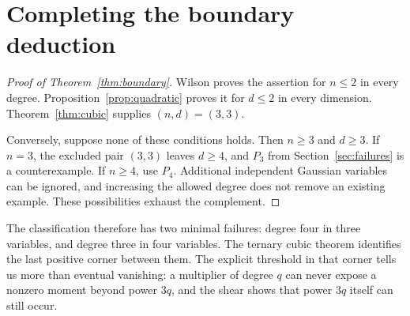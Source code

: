 \documentclass[11pt]{article}
\theoremstyle{definition}\newtheorem{definition}[theorem]{Definition}
\theoremstyle{remark}\newtheorem{remark}[theorem]{Remark}
\begin{document}
\section{Completing the boundary deduction}
\begin{proof}[Proof of Theorem~\ref{thm:boundary}]
Wilson proves the assertion for $n\leq2$ in every degree.
Proposition~\ref{prop:quadratic} proves it for $d\leq2$ in every
dimension. Theorem~\ref{thm:cubic} supplies $(n,d)=(3,3)$.

Conversely, suppose none of these conditions holds. Then $n\geq3$
and $d\geq3$. If $n=3$, the excluded pair $(3,3)$ leaves $d\geq4$,
and $P_3$ from Section~\ref{sec:failures} is a counterexample.
If $n\geq4$, use $P_4$. Additional independent Gaussian variables can
be ignored, and increasing the allowed degree does not remove an
existing example. These possibilities exhaust the complement.
\end{proof}

The classification therefore has two minimal failures: degree four
in three variables, and degree three in four variables. The ternary
cubic theorem identifies the last positive corner between them.
The explicit threshold in that corner tells us more than eventual
vanishing: a multiplier of degree $q$ can never expose a nonzero
moment beyond power $3q$, and the shear shows that power $3q$ itself
can still occur.
\end{document}
